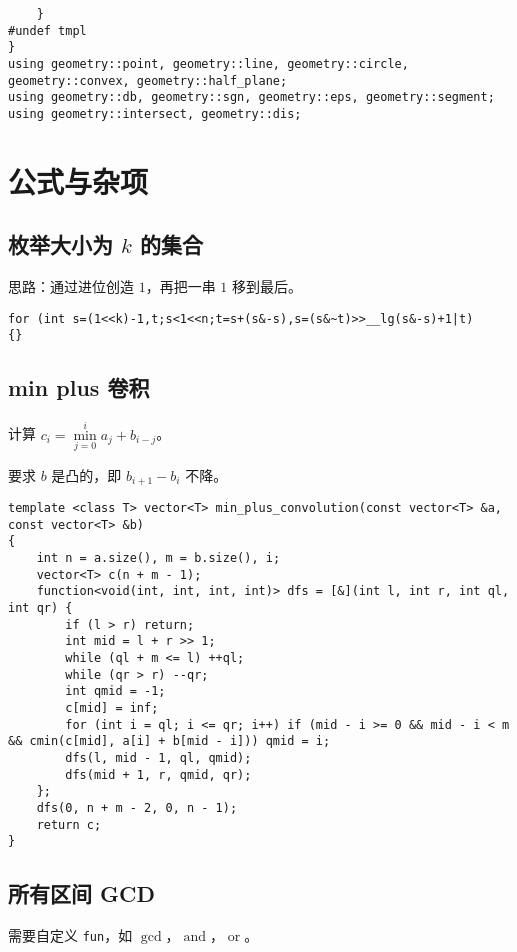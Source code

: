 \documentclass[12pt]{ctexart}
\begin{document}
\begin{lstlisting}
	}
#undef tmpl
}
using geometry::point, geometry::line, geometry::circle, geometry::convex, geometry::half_plane;
using geometry::db, geometry::sgn, geometry::eps, geometry::segment;
using geometry::intersect, geometry::dis;
\end{lstlisting}


\newpage

\section{公式与杂项}

\subsection{枚举大小为 $k$ 的集合}

思路：通过进位创造 $1$，再把一串 $1$ 移到最后。

\begin{lstlisting}
for (int s=(1<<k)-1,t;s<1<<n;t=s+(s&-s),s=(s&~t)>>__lg(s&-s)+1|t)
{}
\end{lstlisting}
\subsection{min plus 卷积}

计算 $c_i=\min\limits_{j=0}^i a_j+b_{i-j}$。

要求 $b$ 是凸的，即 $b_{i+1}-b_i$ 不降。

\begin{lstlisting}
template <class T> vector<T> min_plus_convolution(const vector<T> &a, const vector<T> &b)
{
	int n = a.size(), m = b.size(), i;
	vector<T> c(n + m - 1);
	function<void(int, int, int, int)> dfs = [&](int l, int r, int ql, int qr) {
		if (l > r) return;
		int mid = l + r >> 1;
		while (ql + m <= l) ++ql;
		while (qr > r) --qr;
		int qmid = -1;
		c[mid] = inf;
		for (int i = ql; i <= qr; i++) if (mid - i >= 0 && mid - i < m && cmin(c[mid], a[i] + b[mid - i])) qmid = i;
		dfs(l, mid - 1, ql, qmid);
		dfs(mid + 1, r, qmid, qr);
	};
	dfs(0, n + m - 2, 0, n - 1);
	return c;
}

\end{lstlisting}

\subsection{所有区间 GCD}

需要自定义 \verb|fun|，如 $\gcd$，$\operatorname{and}$，$\operatorname{or}$。
\end{document}
